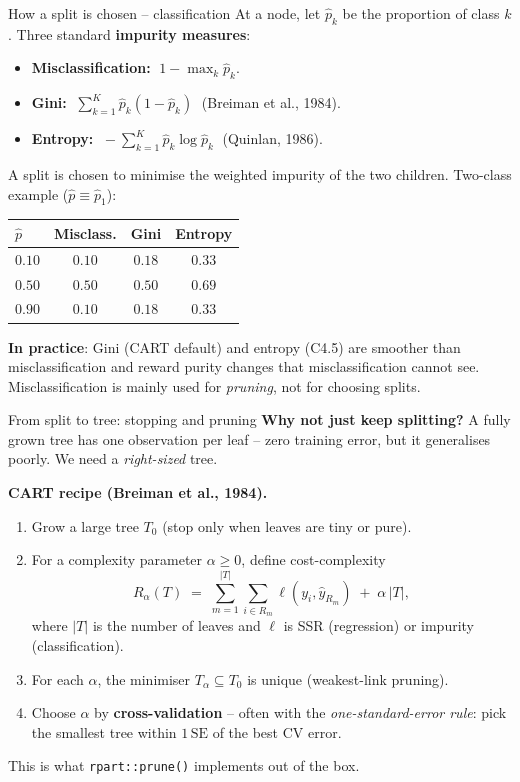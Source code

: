 \documentclass[10pt,ignorenonframetext,aspectratio=169]{beamer}
\begin{document}
\begin{frame}{How a split is chosen -- classification}
At a node, let $\hat p_k$ be the proportion of class $k$. Three standard \textbf{impurity measures}:
\begin{itemize}
    \justifying
    \item \textbf{Misclassification:} $\;1 - \max_k \hat p_k$.
    \item \textbf{Gini:} $\;\sum_{k=1}^{K} \hat p_k (1 - \hat p_k)\;$ (Breiman et al., 1984).
    \item \textbf{Entropy:} $\;-\sum_{k=1}^{K} \hat p_k \log \hat p_k\;$ (Quinlan, 1986).
\end{itemize}
A split is chosen to minimise the weighted impurity of the two children. Two-class example ($\hat p \equiv \hat p_1$):

\medskip
\centering
\begin{tabular}{lccc}
\hline
$\hat p$ & Misclass. & Gini & Entropy \\
\hline
$0.10$ & $0.10$ & $0.18$ & $0.33$ \\
$0.50$ & $0.50$ & $0.50$ & $0.69$ \\
$0.90$ & $0.10$ & $0.18$ & $0.33$ \\
\hline
\end{tabular}

\medskip
\justifying
\textbf{In practice}: Gini (CART default) and entropy (C4.5) are smoother than misclassification and reward purity changes that misclassification cannot see. Misclassification is mainly used for \emph{pruning}, not for choosing splits.
\end{frame}


\begin{frame}{From split to tree: stopping and pruning}
\textbf{Why not just keep splitting?} A fully grown tree has one observation per leaf -- zero training error, but it generalises poorly. We need a \emph{right-sized} tree.

\medskip
\textbf{CART recipe (Breiman et al., 1984).}
\begin{enumerate}
    \justifying
    \item Grow a large tree $T_0$ (stop only when leaves are tiny or pure).
    \item For a complexity parameter $\alpha \ge 0$, define cost-complexity
    \[
        R_\alpha(T) \;=\; \sum_{m=1}^{|T|} \sum_{i \in R_m} \ell(y_i, \hat y_{R_m}) \;+\; \alpha\, |T|,
    \]
    where $|T|$ is the number of leaves and $\ell$ is SSR (regression) or impurity (classification).
    \item For each $\alpha$, the minimiser $T_\alpha \subseteq T_0$ is unique (weakest-link pruning).
    \item Choose $\alpha$ by \textbf{cross-validation} -- often with the \emph{one-standard-error rule}: pick the smallest tree within $1\,\text{SE}$ of the best CV error.
\end{enumerate}

\medskip
This is what \texttt{rpart::prune()} implements out of the box.
\end{frame}
\end{document}
